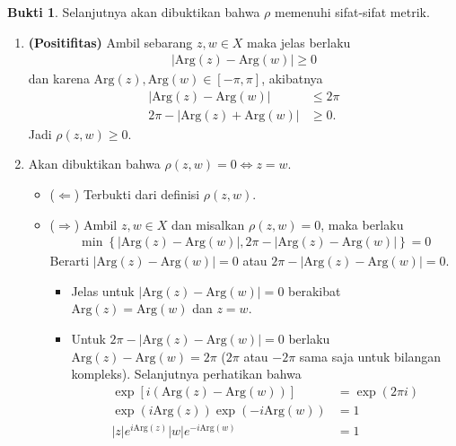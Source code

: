 \documentclass[a4paper]{article}
\theoremstyle{definition}
\newtheorem*{bukti}{Bukti}
\newcommand{\Arg}{\text{Arg}}
\begin{document}
\begin{enumerate}
\begin{bukti}
          Selanjutnya akan dibuktikan bahwa \(\rho\) memenuhi sifat-sifat metrik.
          \begin{enumerate}
            \item \textbf{(Positifitas)} Ambil sebarang \( z, w \in X \) maka jelas berlaku
                  \begin{align*}
                    |\Arg(z) - \Arg(w)| \geq 0
                  \end{align*}
                  dan karena $\Arg(z),\Arg(w) \in [-\pi,\pi]$, akibatnya
                  \begin{align*}
                    |\Arg(z) - \Arg(w)|        & \leq 2\pi \\
                    2\pi - |\Arg(z) + \Arg(w)| & \geq 0.
                  \end{align*}
                  Jadi \(\rho(z,w) \geq 0\).
            \item Akan dibuktikan bahwa \(\rho(z,w) = 0 \iff z = w\).
                  \begin{itemize}
                    \item (\(\Leftarrow\)) Terbukti dari definisi \(\rho(z,w)\).
                    \item (\(\Rightarrow\)) Ambil $z,w\in X$ dan misalkan \( \rho(z,w) = 0 \), maka berlaku
                          \begin{align*}
                            \min\left\{ \left|\Arg(z)-\Arg(w)\right|, 2\pi - \left|\Arg(z) - \Arg(w)\right| \right\} = 0
                          \end{align*}
                          Berarti \(|\Arg(z) - \Arg(w)|=0\) atau \(2\pi - |\Arg(z) - \Arg(w)| = 0\).
                          \begin{itemize}
                            \item Jelas untuk \(|\Arg(z) - \Arg(w)|=0\) berakibat \(\Arg(z) = \Arg(w)\) dan \(z = w\).
                            \item Untuk \(2\pi - |\Arg(z) - \Arg(w)| = 0\) berlaku \(\Arg(z) - \Arg(w) = 2\pi\) ($2\pi$ atau $-2\pi$ sama saja untuk bilangan kompleks). Selanjutnya perhatikan bahwa
                                  \begin{align*}
                                    \exp\left[i(\Arg(z)-\Arg(w))\right] & = \exp(2\pi i)           \\
                                    \exp(i\Arg(z))\exp(-i\Arg(w))       & = 1                      \\
                                    |z|e^{i\Arg(z)}|w|e^{-i\Arg(w)}     & = 1                      \\

\end{align*}
\end{itemize}
\end{itemize}
\end{enumerate}
\end{bukti}
\end{enumerate}
\end{document}
